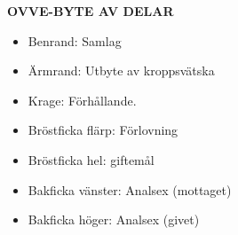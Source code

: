 \textbf{OVVE-BYTE AV DELAR} 
\begin{itemize}
    \setlength\itemsep{-0.8em}
    \item Benrand: Samlag\\
    \item Ärmrand: Utbyte av kroppsvätska\\
    \item Krage: Förhållande.\\
    \item Bröstficka flärp: Förlovning \\
    \item Bröstficka hel: giftemål\\
    \item Bakficka vänster: Analsex (mottaget)\\
    \item Bakficka höger: Analsex (givet)\\
\end{itemize}
